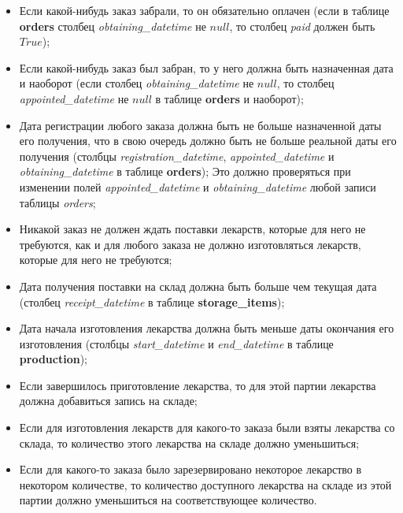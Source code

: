 \documentclass[a4paper]{article}
\newcommand{\dbtable}[1]{\textbf{#1}}
\newcommand{\dbtableref}[1]{\textit{#1}}
\begin{document}
\begin{itemize}
				\item Если какой-нибудь заказ забрали, то он обязательно оплачен (если в таблице \dbtable{orders} столбец \dbtableref{obtaining\_datetime} не $null$, то столбец \dbtableref{paid} должен быть $True$);
				
				\item Если какой-нибудь заказ был забран, то у него должна быть назначенная дата и наоборот (если столбец \dbtableref{obtaining\_datetime} не $null$, то столбец \dbtableref{appointed\_datetime} не $null$ в таблице \dbtable{orders} и наоборот);
				
				\item Дата регистрации любого заказа должна быть не больше назначенной даты его получения, что в свою очередь должно быть не больше реальной даты его получения (столбцы \dbtableref{registration\_datetime}, \dbtableref{appointed\_datetime} и \dbtableref{obtaining\_datetime} в таблице \dbtable{orders}); Это должно проверяться при изменении полей \dbtableref{appointed\_datetime} и \dbtableref{obtaining\_datetime} любой записи таблицы \dbtableref{orders};
				
				\item Никакой заказ не должен ждать поставки лекарств, которые для него не требуются, как и для любого заказа не должно изготовляться лекарств, которые для него не требуются;
					
				\item Дата получения поставки на склад должна быть больше чем текущая дата (столбец \dbtableref{receipt\_datetime} в таблице \dbtable{storage\_items});
				
				\item Дата начала изготовления лекарства должна быть меньше даты окончания его изготовления (столбцы \dbtableref{start\_datetime} и \dbtableref{end\_datetime} в таблице \dbtable{production});
				
				\item Если завершилось приготовление лекарства, то для этой партии лекарства должна добавиться запись на складе;
			
				\item Если для изготовления лекарств для какого-то заказа были взяты лекарства со склада, то количество этого лекарства на складе должно уменьшиться;
			
				\item Если для какого-то заказа было зарезервировано некоторое лекарство в некотором количестве, то количество доступного лекарства на складе из этой партии должно уменьшиться на соответствующее количество.
			\end{itemize}
	\newpage
\end{document}
